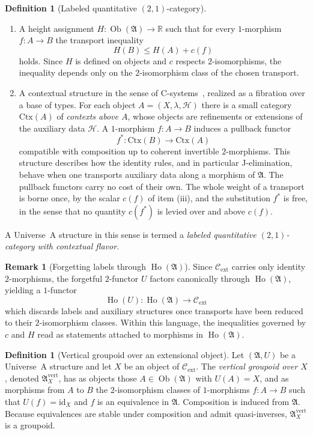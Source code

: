 \documentclass[10pt, reqno]{amsart}
\theoremstyle{plain}
\theoremstyle{definition}
\newtheorem{definition}[theorem]{Definition}
\newtheorem{remark}[theorem]{Remark}
\theoremstyle{plain}
\newcommand{\R}{\mathbb{R}}
\newcommand{\Ho}{\operatorname{Ho}}
\begin{document}
\begin{definition}[Labeled quantitative $(2,1)$-category]
\begin{enumerate}
\item[(iv)] A height assignment $H \colon \operatorname{Ob}(\mathfrak{A}) \to \R$ such that for every $1$-morphism $f \colon A \to B$ the transport inequality
  \[
    H(B) \le H(A) + c(f)
  \]
holds. Since $H$ is defined on objects and $c$ respects $2$-isomorphisms, the inequality depends only on the $2$-isomorphism class of the chosen transport.

\item[(v)] A contextual structure in the sense of C-systems~\cite{voevodsky2023martin}, realized as a fibration over a base of types. For each object $A = (X,\lambda,\mathcal{H})$ there is a small category $\mathrm{Ctx}(A)$ of \emph{contexts above $A$}, whose objects are refinements or extensions of the auxiliary data $\mathcal{H}$. A $1$-morphism $f \colon A \to B$ induces a pullback functor
  \[
    f^\ast \colon \mathrm{Ctx}(B) \longrightarrow \mathrm{Ctx}(A)
  \]
compatible with composition up to coherent invertible $2$-morphisms. This structure describes how the identity rules, and in particular J-elimination, behave when one transports auxiliary data along a morphism of $\mathfrak{A}$. The pullback functors carry no cost of their own. The whole weight of a transport is borne once, by the scalar $c(f)$ of item (iii), and the substitution $f^\ast$ is free, in the sense that no quantity $c(f^\ast)$ is levied over and above $c(f)$.
\end{enumerate}
A Universe~A structure in this sense is termed a \emph{labeled quantitative $(2,1)$-category with contextual flavor}.
\end{definition}

\begin{remark}[Forgetting labels through $\Ho(\mathfrak{A})$]\label{rem:ForgetThroughHo}
Since $\mathcal{C}_{\mathrm{ext}}$ carries only identity $2$-morphisms, the forgetful $2$-functor $U$ factors canonically through $\Ho(\mathfrak{A})$, yielding a $1$-functor
\[
  \Ho(U) \colon \Ho(\mathfrak{A}) \longrightarrow \mathcal{C}_{\mathrm{ext}}
\]
which discards labels and auxiliary structures once transports have been reduced to their $2$-isomorphism classes. Within this language, the inequalities governed by $c$ and $H$ read as statements attached to morphisms in $\Ho(\mathfrak{A})$.
\end{remark}

\begin{definition}[Vertical groupoid over an extensional object]\label{def:VerticalGroupoid}
Let $(\mathfrak{A},U)$ be a Universe~A structure and let $X$ be an object of $\mathcal{C}_{\mathrm{ext}}$. The \emph{vertical groupoid over $X$}, denoted $\mathfrak{A}_X^{\mathrm{vert}}$, has as objects those $A \in \operatorname{Ob}(\mathfrak{A})$ with $U(A) = X$, and as morphisms from $A$ to $B$ the $2$-isomorphism classes of $1$-morphisms $f \colon A \to B$ such that $U(f) = \mathrm{id}_X$ and $f$ is an equivalence in $\mathfrak{A}$. Composition is induced from $\mathfrak{A}$. Because equivalences are stable under composition and admit quasi-inverses, $\mathfrak{A}_X^{\mathrm{vert}}$ is a groupoid.
\end{definition}
\end{document}
